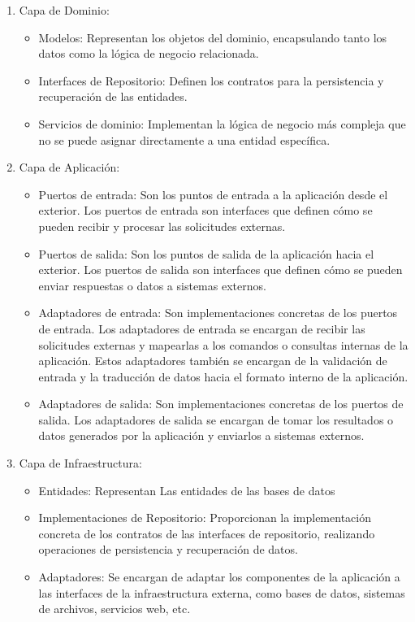 \documentclass[executivepaper]{article}
\begin{document}
\begin{enumerate}
    \item Capa de Dominio:
    \begin{itemize}
        \item Modelos: Representan los objetos del dominio, encapsulando tanto los datos como la lógica de negocio relacionada.
        \item Interfaces de Repositorio: Definen los contratos para la persistencia y recuperación de las entidades.
        \item Servicios de dominio: Implementan la lógica de negocio más compleja que no se puede asignar directamente a una entidad específica.
    \end{itemize}
    \item Capa de Aplicación:
    \begin{itemize}
        \item Puertos de entrada: Son los puntos de entrada a la aplicación desde el exterior. Los puertos de entrada son interfaces que definen cómo se pueden recibir y procesar las solicitudes externas.
        \item Puertos de salida: Son los puntos de salida de la aplicación hacia el exterior. Los puertos de salida son interfaces que definen cómo se pueden enviar respuestas o datos a sistemas externos.
        \item Adaptadores de entrada: Son implementaciones concretas de los puertos de entrada. Los adaptadores de entrada se encargan de recibir las solicitudes externas y mapearlas a los comandos o consultas internas de la aplicación. Estos adaptadores también se encargan de la validación de entrada y la traducción de datos hacia el formato interno de la aplicación.
        \item Adaptadores de salida: Son implementaciones concretas de los puertos de salida. Los adaptadores de salida se encargan de tomar los resultados o datos generados por la aplicación y enviarlos a sistemas externos.
    \end{itemize}
    \item Capa de Infraestructura:
    \begin{itemize}
        \item Entidades: Representan Las entidades de las bases de datos
        \item Implementaciones de Repositorio: Proporcionan la implementación concreta de los contratos de las interfaces de repositorio, realizando operaciones de persistencia y recuperación de datos.
        \item Adaptadores: Se encargan de adaptar los componentes de la aplicación a las interfaces de la infraestructura externa, como bases de datos, sistemas de archivos, servicios web, etc.

\end{itemize}
\end{enumerate}
\end{document}
